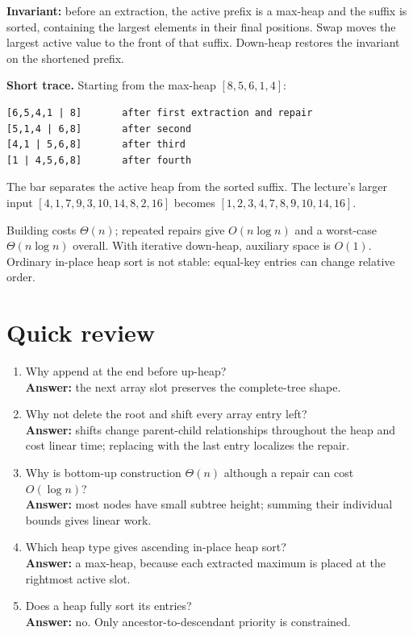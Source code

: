 \documentclass[11pt]{article}
\begin{document}
\textbf{Invariant:} before an extraction, the active prefix is a max-heap and the suffix is sorted, containing the largest elements in their final positions. Swap moves the largest active value to the front of that suffix. Down-heap restores the invariant on the shortened prefix.

\textbf{Short trace.} Starting from the max-heap $[8,5,6,1,4]$:
\begin{lstlisting}
[6,5,4,1 | 8]       after first extraction and repair
[5,1,4 | 6,8]       after second
[4,1 | 5,6,8]       after third
[1 | 4,5,6,8]       after fourth
\end{lstlisting}
The bar separates the active heap from the sorted suffix. The lecture's larger input $[4,1,7,9,3,10,14,8,2,16]$ becomes $[1,2,3,4,7,8,9,10,14,16]$.

Building costs $\Theta(n)$; repeated repairs give $O(n\log n)$ and a worst-case $\Theta(n\log n)$ overall. With iterative down-heap, auxiliary space is $O(1)$. Ordinary in-place heap sort is not stable: equal-key entries can change relative order.

\section{Quick review}
\begin{enumerate}
\item Why append at the end before up-heap?\\
\textbf{Answer:} the next array slot preserves the complete-tree shape.
\item Why not delete the root and shift every array entry left?\\
\textbf{Answer:} shifts change parent-child relationships throughout the heap and cost linear time; replacing with the last entry localizes the repair.
\item Why is bottom-up construction $\Theta(n)$ although a repair can cost $O(\log n)$?\\
\textbf{Answer:} most nodes have small subtree height; summing their individual bounds gives linear work.
\item Which heap type gives ascending in-place heap sort?\\
\textbf{Answer:} a max-heap, because each extracted maximum is placed at the rightmost active slot.
\item Does a heap fully sort its entries?\\
\textbf{Answer:} no. Only ancestor-to-descendant priority is constrained.
\end{enumerate}
\end{document}
